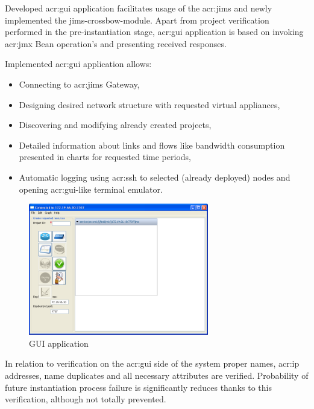 \documentclass[11pt,openany]{book}
\begin{document}
        Developed \gls{acr:gui} application facilitates usage of the \gls{acr:jims} and newly implemented the jims-crossbow-module.
        Apart from project verification performed in the pre-instantiation stage, \gls{acr:gui} application is based on invoking 
        \gls{acr:jmx} Bean operation's and presenting received responses.

        Implemented \gls{acr:gui} application allows:

        \begin{itemize}
          \item Connecting to \gls{acr:jims} Gateway,
          \item Designing desired network structure with requested virtual appliances,
          \item Discovering and modifying already created projects,
          \item Detailed information about links and flows like bandwidth consumption presented in charts for requested
                time periods,
          \item Automatic logging using \gls{acr:ssh} to selected (already deployed) nodes and opening
                \gls{acr:gui}-like terminal emulator.
        \end{itemize}

        \begin{figure}[H]
          \centering
          \includegraphics[width=0.7\textwidth]{img/impl/gui.png}

          \caption{GUI application}
        \end{figure}

        In relation to verification on the \gls{acr:gui} side of the system proper names, \gls{acr:ip} addresses, name duplicates and
        all necessary attributes are verified. Probability of future instantiation process failure is significantly reduces thanks to this verification, 
        although not totally prevented.
\end{document}
